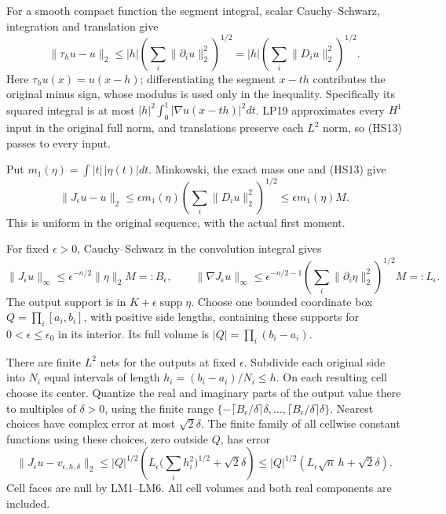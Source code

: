 \documentclass[
  11pt,
]{article}
\begin{document}
For a smooth compact function the segment integral, scalar
Cauchy--Schwarz, integration and translation give \[
 \|\tau_h u-u\|_2
       \leq |h|\left(\sum_i\|\partial_i u\|_2^2\right)^{1/2}
       =|h|\left(\sum_i\|D_i u\|_2^2\right)^{1/2}.              \tag{HS13}
\] Here \(\tau_h u(x)=u(x-h)\); differentiating the segment \(x-th\)
contributes the original minus sign, whose modulus is used only in the
inequality. Specifically its squared integral is at most
\(|h|^2\int_0^1|\nabla u(x-th)|^2dt\). LP19 approximates every \(H^1\)
input in the original full norm, and translations preserve each \(L^2\)
norm, so (HS13) passes to every input.

Put \(m_1(\eta)=\int|t|\,|\eta(t)|dt\). Minkowski, the exact mass one
and (HS13) give \[
 \|J_\epsilon u-u\|_2
   \leq\epsilon m_1(\eta)
               \left(\sum_i\|D_i u\|_2^2\right)^{1/2}
   \leq\epsilon m_1(\eta)M .                                  \tag{HS14}
\] This is uniform in the original sequence, with the actual first
moment.

For fixed \(\epsilon>0\), Cauchy--Schwarz in the convolution integral
gives \[
 \|J_\epsilon u\|_\infty
       \leq\epsilon^{-n/2}\|\eta\|_2M=:B_\epsilon,\qquad
 \|\nabla J_\epsilon u\|_\infty
       \leq\epsilon^{-n/2-1}
             \left(\sum_i\|\partial_i\eta\|_2^2\right)^{1/2}M
       =:L_\epsilon .                                        \tag{HS15}
\] The output support is in \(K+\epsilon\operatorname{supp}\eta\).
Choose one bounded coordinate box \(Q=\prod_i[a_i,b_i]\), with positive
side lengths, containing these supports for \(0<\epsilon\leq\epsilon_0\)
in its interior. Its full volume is \(|Q|=\prod_i(b_i-a_i)\).

There are finite \(L^2\) nets for the outputs at fixed \(\epsilon\).
Subdivide each original side into \(N_i\) equal intervals of length
\(h_i=(b_i-a_i)/N_i\leq h\). On each resulting cell choose its center.
Quantize the real and imaginary parts of the output value there to
multiples of \(\delta>0\), using the finite range
\(\{-\lceil B_\epsilon/\delta\rceil\delta,\ldots,
\lceil B_\epsilon/\delta\rceil\delta\}\). Nearest choices have complex
error at most \(\sqrt2\delta\). The finite family of all cellwise
constant functions using these choices, zero outside \(Q\), has error \[
 \|J_\epsilon u-v_{\epsilon,h,\delta}\|_2
 \leq |Q|^{1/2}
        \left(L_\epsilon\Big(\sum_i h_i^2\Big)^{1/2}
                           +\sqrt2\delta\right)
 \leq |Q|^{1/2}(L_\epsilon\sqrt n\,h+\sqrt2\delta).             \tag{HS16}
\] Cell faces are null by LM1--LM6. All cell volumes and both real
components are included.
\end{document}
